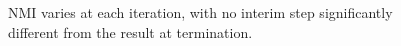     
    \begin{figure}[h!]
        \begin{center}
            
            \caption{\acs{NMI} varies at each iteration, with no interim step significantly different from the result at termination.}
            \label{figure:results-constraint}
        \end{center}
    \end{figure}

